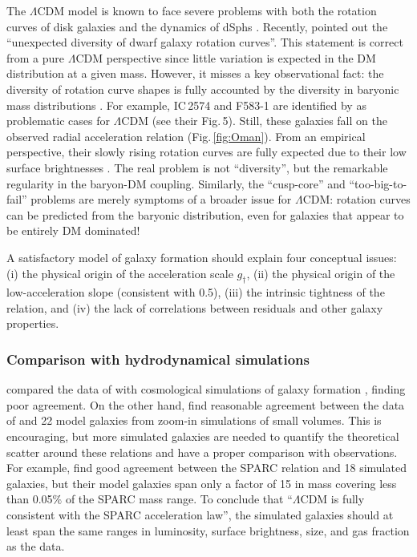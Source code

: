 \documentclass[apjl, twocolappendix]{emulateapj}
\begin{document}
The $\Lambda$CDM model is known to face severe problems with both the rotation curves of disk galaxies \citep[e.g.,][]{Moore1999, deBlok2001, McGaugh2007, Kuzio2009} and the dynamics of dSphs \citep[e.g.,][]{Boylan-Kolchin2011, Walker2011, Pawlowski2014}. Recently, \citet{Oman2015} pointed out the ``unexpected diversity of dwarf galaxy rotation curves''. This statement is correct from a pure $\Lambda$CDM perspective since little variation is expected in the DM distribution at a given mass. However, it misses a key observational fact: the diversity of rotation curve shapes is fully accounted by the diversity in baryonic mass distributions \citep{Sancisi2004, Swaters2012, Lelli2013, Karukes2017}. For example, IC\,2574 and F583-1 are identified by \citet{Oman2015} as problematic cases for $\Lambda$CDM (see their Fig.\,5). Still, these galaxies fall on the observed radial acceleration relation (Fig.\,\ref{fig:Oman}). From an empirical perspective, their slowly rising rotation curves are fully expected due to their low surface brightnesses \citep{Lelli2013}. The real problem is not ``diversity'', but the remarkable regularity in the baryon-DM coupling. Similarly, the ``cusp-core'' and ``too-big-to-fail'' problems are merely symptoms of a broader issue for $\Lambda$CDM: rotation curves can be predicted from the baryonic distribution, even for galaxies that appear to be entirely DM dominated!

A satisfactory model of galaxy formation should explain four conceptual issues: (i) the physical origin of the acceleration scale $g_{\dag}$, (ii) the physical origin of the low-acceleration slope (consistent with 0.5), (iii) the intrinsic tightness of the relation, and (iv) the lack of correlations between residuals and other galaxy properties.

\subsubsection{Comparison with hydrodynamical simulations}

\citet{Wu2015} compared the data of \citet{McGaugh2004} with cosmological simulations of galaxy formation \citep{Agertz2011, Guedes2011, Aumer2013, Marinacci2014}, finding poor agreement. On the other hand, \citet{Santos2016} find reasonable agreement between the data of \citet{McGaugh2014} and 22 model galaxies from zoom-in simulations of small volumes. This is encouraging, but more simulated galaxies are needed to quantify the theoretical scatter around these relations and have a proper comparison with observations. For example, \citet{Keller2016} find good agreement between the SPARC relation and 18 simulated galaxies, but their model galaxies span only a factor of 15 in mass covering less than 0.05$\%$ of the SPARC mass range. To conclude that ``$\Lambda$CDM is fully consistent with the SPARC acceleration law'', the simulated galaxies should at least span the same ranges in luminosity, surface brightness, size, and gas fraction as the data.
\end{document}
